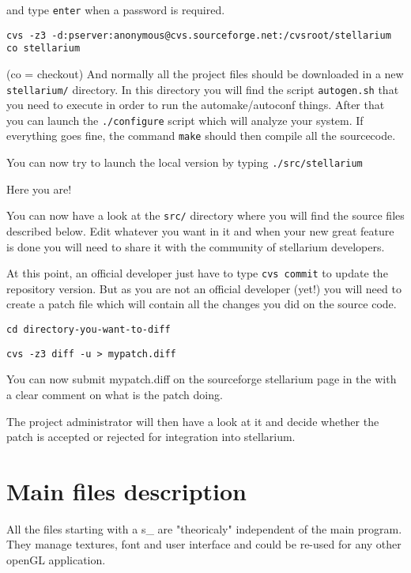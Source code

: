 \documentclass[11pt,oneside] {article}
\begin{document}
and type {\tt enter} when a password is required.

{\tt cvs -z3 -d:pserver:anonymous@cvs.sourceforge.net:/cvsroot/stellarium co stellarium}

(co = checkout)
And normally all the project files should be downloaded in a new {\tt stellarium/} directory.
In this directory you will find the script {\tt autogen.sh} that you need to execute in
order to run the automake/autoconf things.
After that you can launch the {\tt ./configure} script which will analyze your system.
If everything goes fine, the command {\tt make} should then compile all the sourcecode.

You can now try to launch the local version by typing {\tt ./src/stellarium}

Here you are!

You can now have a look at the {\tt src/} directory where you will find the source files described below.
Edit whatever you want in it and when your new great feature is done you will need to share it with the community of stellarium developers.

At this point, an official developer just have to type {\tt cvs commit} to update the repository version. But as you are not an official developer (yet!) you will need to create a patch file which will contain all the changes you did on the source code.

{\tt cd directory-you-want-to-diff}

{\tt cvs -z3 diff -u > mypatch.diff}

You can now submit mypatch.diff on the sourceforge stellarium page in the  with a clear comment on what is the patch doing.

The project administrator will then have a look at it and decide whether the patch is accepted or rejected for integration into stellarium.

\section{Main files description}
All the files starting with a s\_ are "theoricaly" independent of the main program. They manage textures, font and user interface and could be re-used for any other openGL application.
\end{document}
